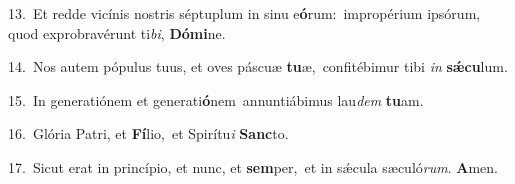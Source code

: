 {\numbfont\textcolor{\numbcolor}{13.}}~Et redde vicínis nostris séptuplum in sinu e\-\textbf{ó}\-rum:~\star impropérium ipsórum, quod exprobravérunt ti\-\textit{bi}\-, \textbf{Dó}\-\textbf{mi}ne.\par
{\numbfont\textcolor{\numbcolor}{14.}}~Nos autem pópulus tuus, et oves páscuæ \textbf{tu}\-æ,~\star confitébimur tibi \textit{in} \textbf{sǽ}\-\textbf{cu}lum.\par
{\numbfont\textcolor{\numbcolor}{15.}}~In generatiónem et generati\-\textbf{ó}\-nem~\star annuntiábimus lau\textit{dem} \textbf{tu}\-am.\par
{\numbfont\textcolor{\numbcolor}{16.}}~Glória Patri, et \textbf{Fí}\-lio,~\star et Spirítu\textit{i} \textbf{Sanc}\-to.\par
{\numbfont\textcolor{\numbcolor}{17.}}~Sicut erat in princípio, et nunc, et \textbf{sem}\-per,~\star et in sǽcula sæculó\-\textit{rum}\-. \textbf{A}\-men.\par
